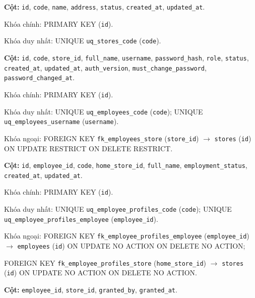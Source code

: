 \begin{description}[leftmargin=3.6cm,labelwidth=3.4cm,style=nextline]

\item[\texttt{stores}] \textbf{Cột:} \texttt{id}, \texttt{code}, \texttt{name}, \texttt{address}, \texttt{status}, \texttt{created\_at}, \texttt{updated\_at}.

Khóa chính: PRIMARY KEY (\texttt{id}).

Khóa duy nhất: UNIQUE \texttt{uq\_stores\_code} (\texttt{code}).

\item[\texttt{employees}] \textbf{Cột:} \texttt{id}, \texttt{code}, \texttt{store\_id}, \texttt{full\_name}, \texttt{username}, \texttt{password\_hash}, \texttt{role}, \texttt{status}, \texttt{created\_at}, \texttt{updated\_at}, \texttt{auth\_version}, \texttt{must\_change\_password}, \texttt{password\_changed\_at}.

Khóa chính: PRIMARY KEY (\texttt{id}).

Khóa duy nhất: UNIQUE \texttt{uq\_employees\_code} (\texttt{code}); UNIQUE \texttt{uq\_employees\_username} (\texttt{username}).

Khóa ngoại: FOREIGN KEY \texttt{fk\_employees\_store} (\texttt{store\_id}) $\rightarrow$ \texttt{stores} (\texttt{id}) ON UPDATE RESTRICT ON DELETE RESTRICT.

\item[\texttt{employee\_profiles}] \textbf{Cột:} \texttt{id}, \texttt{employee\_id}, \texttt{code}, \texttt{home\_store\_id}, \texttt{full\_name}, \texttt{employment\_status}, \texttt{created\_at}, \texttt{updated\_at}.

Khóa chính: PRIMARY KEY (\texttt{id}).

Khóa duy nhất: UNIQUE \texttt{uq\_employee\_profiles\_code} (\texttt{code}); UNIQUE \texttt{uq\_employee\_profiles\_employee} (\texttt{employee\_id}).

Khóa ngoại: FOREIGN KEY \texttt{fk\_employee\_profiles\_employee} (\texttt{employee\_id}) $\rightarrow$ \texttt{employees} (\texttt{id}) ON UPDATE NO ACTION ON DELETE NO ACTION;\par FOREIGN KEY \texttt{fk\_employee\_profiles\_store} (\texttt{home\_store\_id}) $\rightarrow$ \texttt{stores} (\texttt{id}) ON UPDATE NO ACTION ON DELETE NO ACTION.

\item[\texttt{employee\_store\_assignments}] \textbf{Cột:} \texttt{employee\_id}, \texttt{store\_id}, \texttt{granted\_by}, \texttt{granted\_at}.


\end{description}
